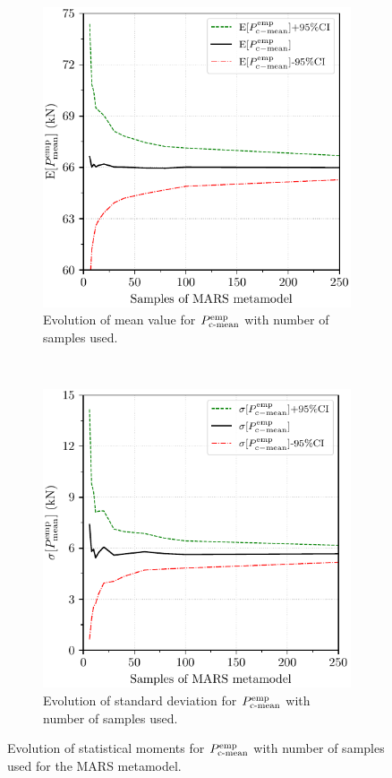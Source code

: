 \documentclass[12pt,number,preprint,review,times]{elsarticle}
\begin{document}
\begin{figure}[htpb]
\centering
\begin{subfigure}[b]{1.0\columnwidth}
  \centering
   \includegraphics[width=.85\columnwidth]{./surr_stats_mean.pdf}
  \caption{Evolution of mean value for $P^{\mathrm{emp}}_{\mathrm{c{\text -}mean}}$ with number of samples used.}
  \label{fig:surr_stats_mean-mars}
\end{subfigure}
~\\[3pt]
\begin{subfigure}[b]{1.0\columnwidth}
  \centering
   \includegraphics[width=.85\columnwidth]{./surr_stats_std.pdf}
  \caption{Evolution of standard deviation for $P^{\mathrm{emp}}_{\mathrm{c{\text -}mean}}$ with number of samples used.}
  \label{fig:surr_stats_std-mars}
\end{subfigure}
\caption{Evolution of statistical moments for $P^{\mathrm{emp}}_{\mathrm{c{\text -}mean}}$ with number of samples used for the MARS metamodel.}
\label{fig:surr_stats-mars}
\end{figure}
\end{document}
